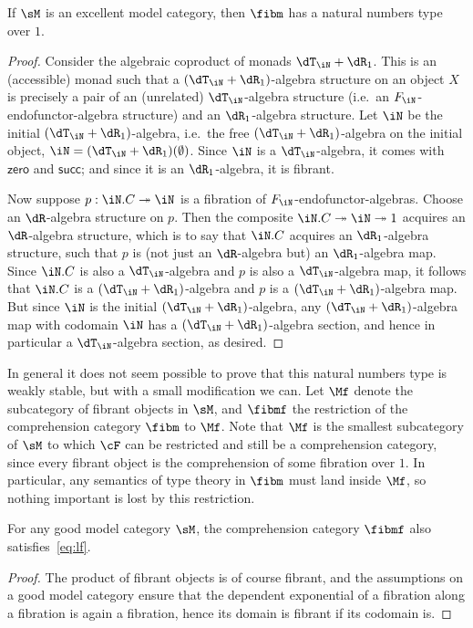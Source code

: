 \documentclass{amsart}
\let\N\iN
\def\zero{\mathsf{zero}}
\def\succ{\mathsf{succ}}
\begin{document}
\begin{thm}
  If $\sM$ is an excellent model category, then $\fibm$ has a natural numbers type over $1$.
\end{thm}
\begin{proof}
  Consider the algebraic coproduct of monads $\dT_\N+\dR_1$.
  This is an (accessible) monad such that a $(\dT_\N+\dR_1)$-algebra structure on an object $X$ is precisely a pair of an (unrelated) $\dT_\N$-algebra structure (i.e.\ an $F_\N$-endofunctor-algebra structure) and an $\dR_1$-algebra structure.
  Let $\N$ be the initial $(\dT_\N+\dR_1)$-algebra, i.e.\ the free $(\dT_\N+\dR_1)$-algebra on the initial object, $\N =(\dT_\N+\dR_1)(\emptyset)$.
  Since $\N$ is a $\dT_\N$-algebra, it comes with $\zero$ and $\succ$; and since it is an $\dR_1$-algebra, it is fibrant.

  Now suppose $p:\N.C\fib \N$ is a fibration of $F_\N$-endofunctor-algebras.
  Choose an $\dR$-algebra structure on $p$.
  Then the composite $\N.C\fib\N\fib 1$ acquires an $\dR$-algebra structure, which is to say that $\N.C$ acquires an $\dR_1$-algebra structure, such that $p$ is (not just an $\dR$-algebra but) an $\dR_1$-algebra map.
  Since $\N.C$ is also a $\dT_\N$-algebra and $p$ is also a $\dT_\N$-algebra map, it follows that $\N.C$ is a $(\dT_\N+\dR_1)$-algebra and $p$ is a $(\dT_\N+\dR_1)$-algebra map.
  But since $\N$ is the initial $(\dT_\N+\dR_1)$-algebra, any $(\dT_\N+\dR_1)$-algebra map with codomain $\N$ has a $(\dT_\N+\dR_1)$-algebra section, and hence in particular a $\dT_\N$-algebra section, as desired.
\end{proof}

In general it does not seem possible to prove that this natural numbers type is weakly stable, but with a small modification  we can.
Let $\Mf$ denote the subcategory of fibrant objects in $\sM$, and $\fibmf$ the restriction of the comprehension category $\fibm$ to $\Mf$.
Note that $\Mf$ is the smallest subcategory of $\sM$ to which $\cF$ can be restricted and still be a comprehension category, since every fibrant object is the comprehension of some fibration over $1$.
In particular, any semantics of type theory in $\fibm$ must land inside $\Mf$, so nothing important is lost by this restriction.

\begin{lem}
  For any good model category $\sM$, the comprehension category $\fibmf$ also satisfies~\eqref{eq:lf}.
\end{lem}
\begin{proof}
  The product of fibrant objects is of course fibrant, and the assumptions on a good model category ensure that the dependent exponential of a fibration along a fibration is again a fibration, hence its domain is fibrant if its codomain is.
\end{proof}
\end{document}
